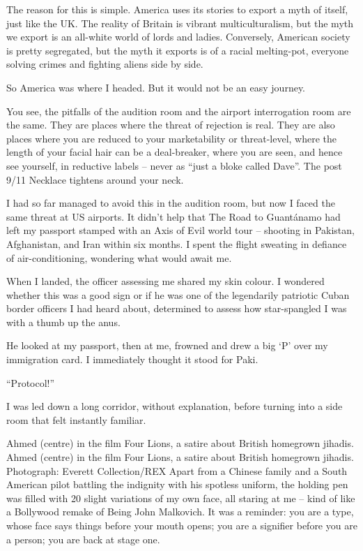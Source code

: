 \documentclass[10pt,a4paper]{article}
\begin{document}
The reason for this is simple. America uses its stories to export a myth of itself, just like the UK. The reality of Britain is vibrant multiculturalism, but the myth we export is an all-white world of lords and ladies. Conversely, American society is pretty segregated, but the myth it exports is of a racial melting-pot, everyone solving crimes and fighting aliens side by side.

So America was where I headed. But it would not be an easy journey.

You see, the pitfalls of the audition room and the airport interrogation room are the same. They are places where the threat of rejection is real. They are also places where you are reduced to your marketability or threat-level, where the length of your facial hair can be a deal-breaker, where you are seen, and hence see yourself, in reductive labels – never as “just a bloke called Dave”. The post 9/11 Necklace tightens around your neck.

I had so far managed to avoid this in the audition room, but now I faced the same threat at US airports. It didn’t help that The Road to Guantánamo had left my passport stamped with an Axis of Evil world tour – shooting in Pakistan, Afghanistan, and Iran within six months. I spent the flight sweating in defiance of air-conditioning, wondering what would await me.

When I landed, the officer assessing me shared my skin colour. I wondered whether this was a good sign or if he was one of the legendarily patriotic Cuban border officers I had heard about, determined to assess how star-spangled I was with a thumb up the anus.

He looked at my passport, then at me, frowned and drew a big ‘P’ over my immigration card. I immediately thought it stood for Paki.

“Protocol!”

I was led down a long corridor, without explanation, before turning into a side room that felt instantly familiar.

Ahmed (centre) in the film Four Lions, a satire about British homegrown jihadis.
Ahmed (centre) in the film Four Lions, a satire about British homegrown jihadis. Photograph: Everett Collection/REX
Apart from a Chinese family and a South American pilot battling the indignity with his spotless uniform, the holding pen was filled with 20 slight variations of my own face, all staring at me – kind of like a Bollywood remake of Being John Malkovich. It was a reminder: you are a type, whose face says things before your mouth opens; you are a signifier before you are a person; you are back at stage one.
\end{document}
